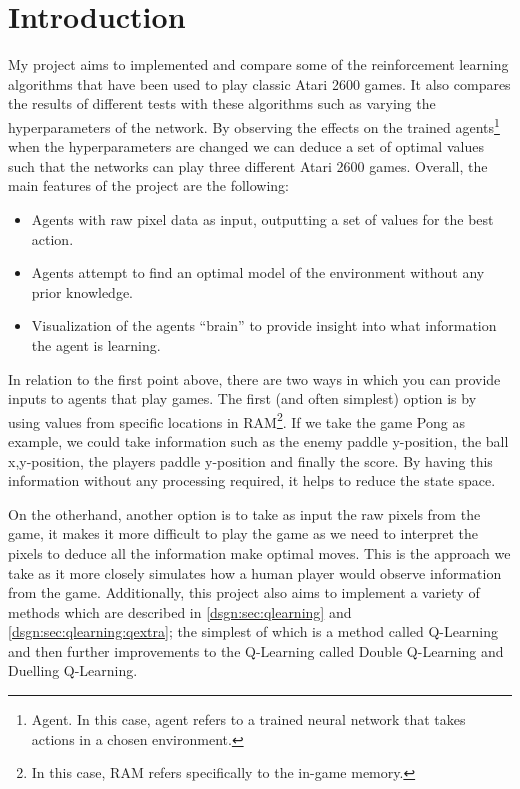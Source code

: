 \chapter{Introduction}
\label{cha:intro}
My project aims to implemented and compare some of the reinforcement learning algorithms that have been used to play classic Atari 2600 games. It also compares the results of different tests with these algorithms such as varying the hyperparameters of the network. By observing the effects on the trained agents\footnote{Agent. In this case, agent refers to a trained neural network that takes actions in a chosen environment.} when the hyperparameters are changed we can deduce a set of optimal values such that the networks can play three different Atari 2600 games. Overall, the main features of the project are the following:
\begin{itemize}
  \item Agents with raw pixel data as input, outputting a set of values for the best action.
  \item Agents attempt to find an optimal model of the environment without any prior knowledge.
  \item Visualization of the agents ``brain'' to provide insight into what information the agent is learning.
\end{itemize}

In relation to the first point above, there are two ways in which you can provide inputs to agents that play games. The first (and often simplest) option is by using values from specific locations in RAM\footnote{In this case, RAM refers specifically to the in-game memory.}. If we take the game Pong as example, we could take information such as the enemy paddle y-position, the ball x,y-position, the players paddle y-position and finally the score. By having this information without any processing required, it helps to reduce the state space.

On the otherhand, another option is to take as input the raw pixels from the game, it makes it more difficult to play the game as we need to interpret the pixels to deduce all the information make optimal moves. This is the approach we take as it more closely simulates how a human player would observe information from the game. Additionally, this project also aims to implement a variety of methods which are described in \ref{dsgn:sec:qlearning} and \ref{dsgn:sec:qlearning:qextra}; the simplest of which is a method called Q-Learning and then further improvements to the Q-Learning called Double Q-Learning and Duelling Q-Learning.

